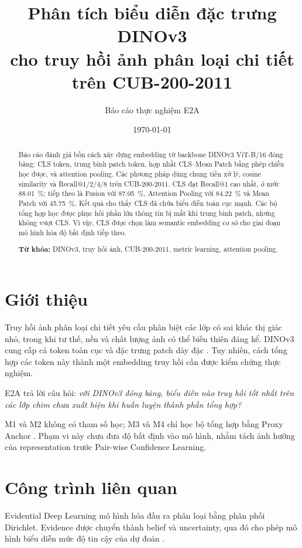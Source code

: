 \documentclass[11pt,a4paper]{article}
\title{\bfseries\LARGE Phân tích biểu diễn đặc trưng DINOv3\\[0.3em]
cho truy hồi ảnh phân loại chi tiết trên CUB-200-2011}
\author{Báo cáo thực nghiệm E2A}
\date{\today}
\begin{document}
\maketitle
\thispagestyle{plain}

\begin{abstract}
Báo cáo đánh giá bốn cách xây dựng embedding từ backbone DINOv3 ViT-B/16 đóng băng: CLS token, trung bình patch token, hợp nhất CLS--Mean Patch bằng phép chiếu học được, và attention pooling. Các phương pháp dùng chung tiền xử lý, cosine similarity và Recall@1/2/4/8 trên CUB-200-2011. CLS đạt Recall@1 cao nhất, ở mức \SI{88.01}{\percent}; tiếp theo là Fusion với \SI{87.05}{\percent}, Attention Pooling với \SI{84.22}{\percent} và Mean Patch với \SI{45.75}{\percent}. Kết quả cho thấy CLS đã chứa biểu diễn toàn cục mạnh. Các bộ tổng hợp học được phục hồi phần lớn thông tin bị mất khi trung bình patch, nhưng không vượt CLS. Vì vậy, CLS được chọn làm semantic embedding cơ sở cho giai đoạn mô hình hóa độ bất định tiếp theo.

\noindent\textbf{Từ khóa:} DINOv3, truy hồi ảnh, CUB-200-2011, metric learning, attention pooling.
\end{abstract}

\section{Giới thiệu}
Truy hồi ảnh phân loại chi tiết yêu cầu phân biệt các lớp có sai khác thị giác nhỏ, trong khi tư thế, nền và chất lượng ảnh có thể biến thiên đáng kể. DINOv3 cung cấp cả token toàn cục và đặc trưng patch dày đặc \cite{simeoni2025dinov3}. Tuy nhiên, cách tổng hợp các token này thành một embedding truy hồi cần được kiểm chứng thực nghiệm.

E2A trả lời câu hỏi: \emph{với DINOv3 đóng băng, biểu diễn nào truy hồi tốt nhất trên các lớp chim chưa xuất hiện khi huấn luyện thành phần tổng hợp?}

M1 và M2 không có tham số học; M3 và M4 chỉ học bộ tổng hợp bằng Proxy Anchor \cite{kim2020proxy}. Phạm vi này chưa đưa độ bất định vào mô hình, nhằm tách ảnh hưởng của representation trước Pair-wise Confidence Learning.

\section{Công trình liên quan}
Evidential Deep Learning mô hình hóa đầu ra phân loại bằng phân phối Dirichlet. Evidence được chuyển thành belief và uncertainty, qua đó cho phép mô hình biểu diễn mức độ tin cậy của dự đoán \cite{sensoy2018evidential}.
\end{document}
